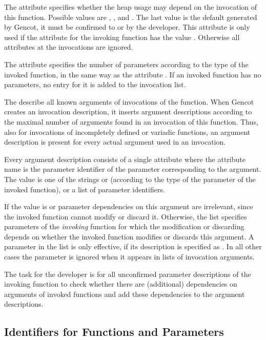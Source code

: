 The attribute  specifies whether the heap usage may depend on the invocation of this function.
Possible values are , , and . The last value is the default generated by Gencot, it must be
confirmed to  or  by the developer. This attribute is only used if the attribute 
for the invoking function has the value . Otherwise all  attributes at the 
invocations are ignored.

The attribute 
specifies the number of parameters according to the type of the invoked function, in the same way as the attribute
. If an invoked function has no parameters, no entry for it is added to the invocation list.

The  describe all known arguments of invocations of the function. When Gencot creates an
invocation description, it inserts argument descriptions according to the maximal number of arguments found in an 
invocation of this function. Thus, also for invocations of incompletely defined or variadic functions, an argument
description is present for every actual argument used in an invocation.

Every argument description consists of a single attribute where the attribute name is the parameter identifier of the 
parameter corresponding to the argument. The value is one of the strings  or 
(according to the type of the parameter of the invoked function), or a list of parameter identifiers.

If the value is  or  parameter dependencies on this argument are irrelevant, since
the invoked function cannot modify or discard it. Otherwise, the list specifies parameters of the \textit{invoking}
function for which the modification or discarding depends on whether the invoked function modifies or discards this
argument. A parameter in the list is only effective, if its description is specified as . In all other
cases the parameter is ignored when it appears in lists of invocation arguments.

The task for the developer is for all unconfirmed parameter descriptions of the invoking function to check whether
there are (additional) dependencies on arguments of invoked functions and add these dependencies to the argument 
descriptions.

\subsection{Identifiers for Functions and Parameters}
\label{impl-parmod-ids}

